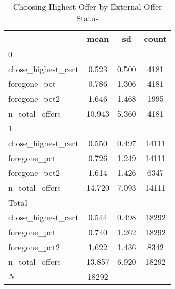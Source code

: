 \begin{table}[htbp]\centering
\def\sym#1{\ifmmode^{#1}\else\(^{#1}\)\fi}
\caption{Choosing Highest Offer by External Offer Status}
\begin{tabular}{l*{1}{ccc}}
\hline\hline
            &        mean&          sd&       count\\
\hline
0           &            &            &            \\
chose\_highest\_cert&       0.523&       0.500&        4181\\
foregone\_pct&       0.786&       1.306&        4181\\
foregone\_pct2&       1.646&       1.468&        1995\\
n\_total\_offers&      10.943&       5.360&        4181\\
\hline
1           &            &            &            \\
chose\_highest\_cert&       0.550&       0.497&       14111\\
foregone\_pct&       0.726&       1.249&       14111\\
foregone\_pct2&       1.614&       1.426&        6347\\
n\_total\_offers&      14.720&       7.093&       14111\\
\hline
Total       &            &            &            \\
chose\_highest\_cert&       0.544&       0.498&       18292\\
foregone\_pct&       0.740&       1.262&       18292\\
foregone\_pct2&       1.622&       1.436&        8342\\
n\_total\_offers&      13.857&       6.920&       18292\\
\hline
\(N\)       &       18292&            &            \\
\hline\hline
\end{tabular}
\end{table}

